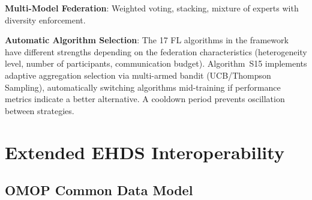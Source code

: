 \documentclass[conference]{IEEEtran}
\begin{document}
\textbf{Multi-Model Federation}: Weighted voting, stacking, mixture of experts with diversity enforcement.

\textbf{Automatic Algorithm Selection}: The 17 FL algorithms in the framework have different strengths depending on the federation characteristics (heterogeneity level, number of participants, communication budget). Algorithm~S15 implements adaptive aggregation selection via multi-armed bandit (UCB/Thompson Sampling), automatically switching algorithms mid-training if performance metrics indicate a better alternative. A cooldown period prevents oscillation between strategies.

\begin{figure}[htbp]
\centering
{}
\end{figure}

\section{Extended EHDS Interoperability}
\label{sec:interop}

\subsection{OMOP Common Data Model}
\end{document}

